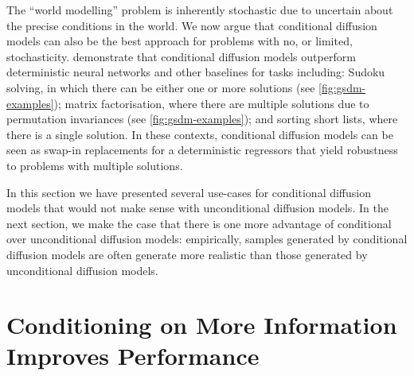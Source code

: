 The ``world modelling'' problem is inherently stochastic due to uncertain about the precise conditions in the world. We now argue that conditional diffusion models can also be the best approach for problems with no, or limited, stochasticity. \citet{weilbach2023graphically,weilbach2023scaling} demonstrate that conditional diffusion models outperform deterministic neural networks and other baselines for tasks including: Sudoku solving, in which there can be either one or more solutions (see \cref{fig:gsdm-examples}); matrix factorisation, where there are multiple solutions due to permutation invariances (see \cref{fig:gsdm-examples}); and sorting short lists, where there is a single solution. In these contexts, conditional diffusion models can be seen as swap-in replacements for a deterministic regressors that yield robustness to problems with multiple solutions.

In this section we have presented several use-cases for conditional diffusion models that would not make sense with unconditional diffusion models. In the next section, we make the case that there is one more advantage of conditional over unconditional diffusion models: empirically, samples generated by conditional diffusion models are often generate more realistic than those generated by unconditional diffusion models.

\section{Conditioning on More Information Improves Performance}


